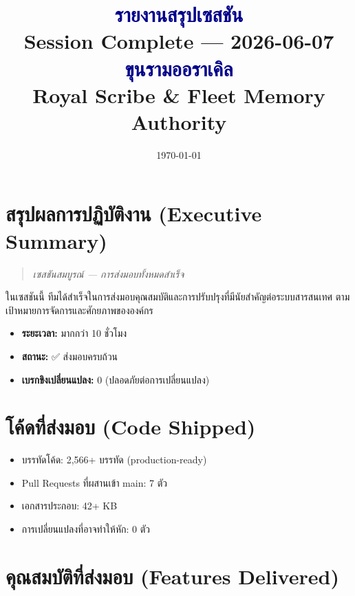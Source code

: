 \documentclass[11pt]{article}
\title{%
    \textcolor{darkblue}{\textbf{รายงานสรุปเซสชัน}} \\[0.5cm]
    {\large \textcolor{sagegreen}{Session Complete — 2026-06-07}} \\[0.3cm]
    {\normalsize \textcolor{darkblue}{ขุนรามออราเคิล}} \\
    {\small Royal Scribe \& Fleet Memory Authority}
}
\author{}
\date{\today}
\begin{document}
\maketitle

\vspace{1cm}

\section{สรุปผลการปฏิบัติงาน (Executive Summary)}

\begin{quote}
\textcolor{sagegreen}{\textit{เซสชันสมบูรณ์ — การส่งมอบทั้งหมดสำเร็จ}}
\end{quote}

ในเซสชันนี้ ทีมได้สำเร็จในการส่งมอบคุณสมบัติและการปรับปรุงที่มีนัยสำคัญต่อระบบสารสนเทศ ตามเป้าหมายการจัดการและศักยภาพขององค์กร

\begin{itemize}
    \item \textbf{ระยะเวลา:} มากกว่า 10 ชั่วโมง
    \item \textbf{สถานะ:} ✅ ส่งมอบครบถ้วน
    \item \textbf{เบรกขิงเปลี่ยนแปลง:} 0 (ปลอดภัยต่อการเปลี่ยนแปลง)
\end{itemize}

\section{โค้ดที่ส่งมอบ (Code Shipped)}

\begin{itemize}
    \item บรรทัดโค้ด: 2,566+ บรรทัด (production-ready)
    \item Pull Requests ที่ผสานเข้า main: 7 ตัว
    \item เอกสารประกอบ: 42+ KB
    \item การเปลี่ยนแปลงที่อาจทำให้หัก: 0 ตัว
\end{itemize}

\section{คุณสมบัติที่ส่งมอบ (Features Delivered)}
\end{document}
